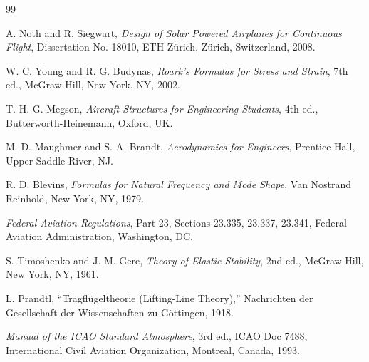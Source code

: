 \documentclass[10pt,a4paper]{article}
\begin{document}
\newpage

\begin{thebibliography}{99}

A. Noth and R. Siegwart, \textit{Design of Solar Powered Airplanes for Continuous Flight}, Dissertation No. 18010, ETH Zürich, Zürich, Switzerland, 2008.

W. C. Young and R. G. Budynas, \textit{Roark's Formulas for Stress and Strain}, 7th ed., McGraw-Hill, New York, NY, 2002.

T. H. G. Megson, \textit{Aircraft Structures for Engineering Students}, 4th ed., Butterworth-Heinemann, Oxford, UK.

M. D. Maughmer and S. A. Brandt, \textit{Aerodynamics for Engineers}, Prentice Hall, Upper Saddle River, NJ.

R. D. Blevins, \textit{Formulas for Natural Frequency and Mode Shape}, Van Nostrand Reinhold, New York, NY, 1979.

\textit{Federal Aviation Regulations}, Part 23, Sections 23.335, 23.337, 23.341, Federal Aviation Administration, Washington, DC.

S. Timoshenko and J. M. Gere, \textit{Theory of Elastic Stability}, 2nd ed., McGraw-Hill, New York, NY, 1961.

L. Prandtl, “Tragflügeltheorie (Lifting-Line Theory),” Nachrichten der Gesellschaft der Wissenschaften zu Göttingen, 1918.

\textit{Manual of the ICAO Standard Atmosphere}, 3rd ed., ICAO Doc 7488, International Civil Aviation Organization, Montreal, Canada, 1993.

\end{thebibliography}
\end{document}

